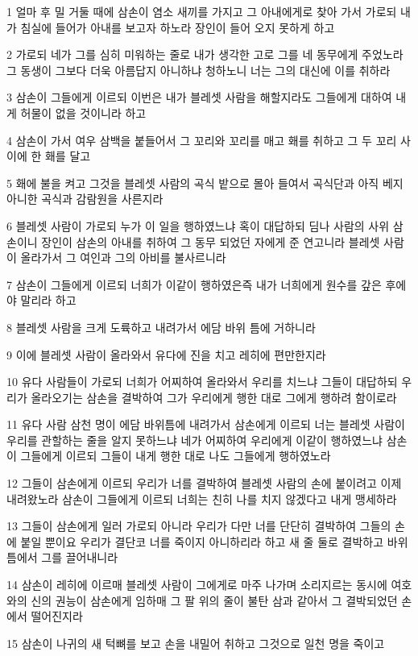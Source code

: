 \par 1 얼마 후 밀 거둘 때에 삼손이 염소 새끼를 가지고 그 아내에게로 찾아 가서 가로되 내가 침실에 들어가 아내를 보고자 하노라 장인이 들어 오지 못하게 하고
\par 2 가로되 네가 그를 심히 미워하는 줄로 내가 생각한 고로 그를 네 동무에게 주었노라 그 동생이 그보다 더욱 아름답지 아니하냐 청하노니 너는 그의 대신에 이를 취하라
\par 3 삼손이 그들에게 이르되 이번은 내가 블레셋 사람을 해할지라도 그들에게 대하여 내게 허물이 없을 것이니라 하고
\par 4 삼손이 가서 여우 삼백을 붙들어서 그 꼬리와 꼬리를 매고 홰를 취하고 그 두 꼬리 사이에 한 홰를 달고
\par 5 홰에 불을 켜고 그것을 블레셋 사람의 곡식 밭으로 몰아 들여서 곡식단과 아직 베지 아니한 곡식과 감람원을 사른지라
\par 6 블레셋 사람이 가로되 누가 이 일을 행하였느냐 혹이 대답하되 딤나 사람의 사위 삼손이니 장인이 삼손의 아내를 취하여 그 동무 되었던 자에게 준 연고니라 블레셋 사람이 올라가서 그 여인과 그의 아비를 불사르니라
\par 7 삼손이 그들에게 이르되 너희가 이같이 행하였은즉 내가 너희에게 원수를 갚은 후에야 말리라 하고
\par 8 블레셋 사람을 크게 도륙하고 내려가서 에담 바위 틈에 거하니라
\par 9 이에 블레셋 사람이 올라와서 유다에 진을 치고 레히에 편만한지라
\par 10 유다 사람들이 가로되 너희가 어찌하여 올라와서 우리를 치느냐 그들이 대답하되 우리가 올라오기는 삼손을 결박하여 그가 우리에게 행한 대로 그에게 행하려 함이로라
\par 11 유다 사람 삼천 명이 에담 바위틈에 내려가서 삼손에게 이르되 너는 블레셋 사람이 우리를 관할하는 줄을 알지 못하느냐 네가 어찌하여 우리에게 이같이 행하였느냐 삼손이 그들에게 이르되 그들이 내게 행한 대로 나도 그들에게 행하였노라
\par 12 그들이 삼손에게 이르되 우리가 너를 결박하여 블레셋 사람의 손에 붙이려고 이제 내려왔노라 삼손이 그들에게 이르되 너희는 친히 나를 치지 않겠다고 내게 맹세하라
\par 13 그들이 삼손에게 일러 가로되 아니라 우리가 다만 너를 단단히 결박하여 그들의 손에 붙일 뿐이요 우리가 결단코 너를 죽이지 아니하리라 하고 새 줄 둘로 결박하고 바위틈에서 그를 끌어내니라
\par 14 삼손이 레히에 이르매 블레셋 사람이 그에게로 마주 나가며 소리지르는 동시에 여호와의 신의 권능이 삼손에게 임하매 그 팔 위의 줄이 불탄 삼과 같아서 그 결박되었던 손에서 떨어진지라
\par 15 삼손이 나귀의 새 턱뼈를 보고 손을 내밀어 취하고 그것으로 일천 명을 죽이고
